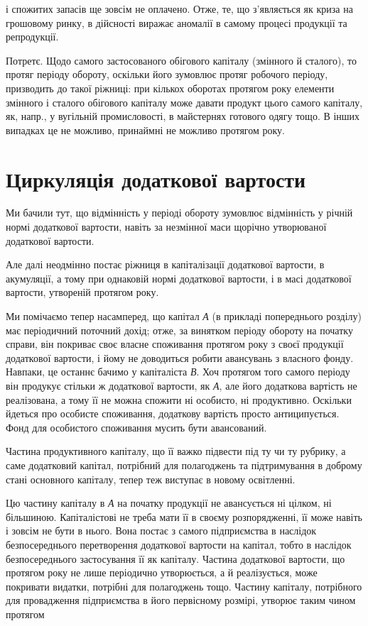 \parcont{}  %
і спожитих запасів ще зовсім не оплачено. Отже, те, що з’являється
як криза на грошовому ринку, в дійсності виражає аномалії в самому процесі
продукції та репродукції.

Потретє. Щодо самого застосованого обігового капіталу (змінного
й сталого), то протяг періоду обороту, оскільки його зумовлює протяг
робочого періоду, призводить до такої ріжниці: при кількох оборотах
протягом року елементи змінного і сталого обігового капіталу може
давати продукт цього самого капіталу, як, напр., у вугільній промисловості,
в майстернях готового одягу тощо. В інших випадках це не можливо,
принаймні не можливо протягом року.

\section{Циркуляція додаткової вартости}

Ми бачили тут, що відмінність у періоді обороту зумовлює відмінність
у річній нормі додаткової вартости, навіть за незмінної маси щорічно
утворюваної додаткової вартости.

Але далі неодмінно постає ріжниця в капіталізації додаткової вартости,
в акумуляції, а тому при однаковій нормі додаткової вартости,
і в масі додаткової вартости, утвореній протягом року.

Ми помічаємо тепер насамперед, що капітал \emph{А} (в прикладі попереднього
розділу) має періодичний поточний дохід; отже, за винятком періоду
обороту на початку справи, він покриває своє власне споживання
протягом року з своєї продукції додаткової вартости, і йому не доводиться
робити авансувань з власного фонду. Навпаки, це останнє
бачимо у капіталіста \emph{В}. Хоч протягом того самого періоду він продукує
стільки ж додаткової вартости, як \emph{А}, але його додаткова вартість не
реалізована, а тому її не можна спожити ні особисто, ні продуктивно. Оскільки
йдеться про особисте споживання, додаткову вартість просто антиципується.
Фонд для особистого споживання мусить бути авансований.

Частина продуктивного капіталу, що її важко підвести під ту чи ту
рубрику, а саме додатковий капітал, потрібний для полагоджень та підтримування
в доброму стані основного капіталу, тепер теж виступає в
новому освітленні.

Цю частину капіталу в \emph{А} на початку продукції не авансується ні
цілком, ні більшиною. Капіталістові не треба мати її в своєму розпорядженні,
її може навіть і зовсім не бути в нього. Вона постає з самого
підприємства в наслідок безпосереднього перетворення додаткової вартости
на капітал, тобто в наслідок безпосереднього застосування її як капіталу.
Частина додаткової вартости, що протягом року не лише періодично
утворюється, а й реалізується, може покривати видатки, потрібні для
полагоджень тощо. Частину капіталу, потрібного для провадження підприємства
в його первісному розмірі, утворює таким чином протягом
\parbreak{}  %

